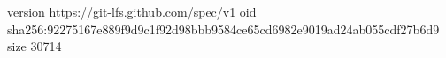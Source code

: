 version https://git-lfs.github.com/spec/v1
oid sha256:92275167e889f9d9c1f92d98bbb9584ce65cd6982e9019ad24ab055cdf27b6d9
size 30714
